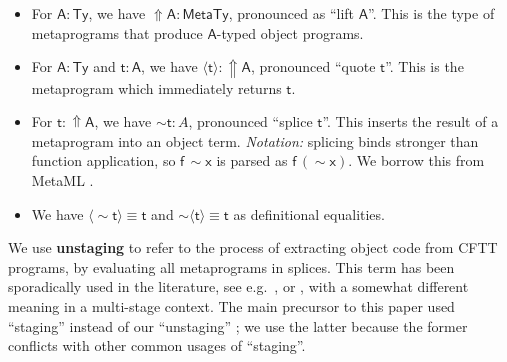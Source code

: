 \documentclass[acmsmall]{acmart}
\newcommand{\msf}[1]{{\mathsf{#1}}}
\newcommand{\bs}[1]{\boldsymbol{#1}}
\newcommand{\vA}{\mathsf{A}}
\newcommand{\vx}{\mathsf{x}}
\newcommand{\vf}{\mathsf{f}}
\newcommand{\vt}{\mathsf{t}}
\newcommand{\Lift}{{\Uparrow}}
\newcommand{\spl}{{\bs{\sim}}}
\newcommand{\ql}{{\bs{\langle}}}
\newcommand{\qr}{{\bs{\rangle}}}
\newcommand{\MTy}{\msf{MetaTy}}
\newcommand{\Ty}{\msf{Ty}}
\theoremstyle{remark}
\begin{document}
\begin{itemize}
\item For $\vA : \Ty$, we have $\Lift \vA : \MTy$, pronounced as ``lift $\vA$''. This is
      the type of metaprograms that produce $\vA$-typed object programs.
\item For $\vA : \Ty$ and $\vt : \vA$, we have $\ql \vt \qr : \Lift \vA$, pronounced ``quote $\vt$''. This
      is the metaprogram which immediately returns $\vt$.
\item For $\vt : \Lift \vA$, we have $\spl \vt : A$, pronounced ``splice
  $\vt$''. This inserts the result of a metaprogram into an object
  term. \emph{Notation:} splicing binds stronger than function application, so
  $\vf\,\spl \vx$ is parsed as $\vf\,(\spl \vx)$. We borrow this from
  MetaML \cite{metaml}.
\item We have $\ql \spl \vt \qr \equiv \vt$ and $\spl \ql \vt \qr \equiv \vt$ as definitional equalities.
\end{itemize}

We use \textbf{unstaging} to refer to the process of extracting object code from
CFTT programs, by evaluating all metaprograms in splices. This term has been
sporadically used in the literature, see
e.g.\ \cite{DBLP:journals/cacm/RompfO12}, or \cite{DBLP:conf/popl/ChoiAYT11},
with a somewhat different meaning in a multi-stage context. The main precursor
to this paper used ``staging'' instead of our ``unstaging'' \cite{staged2ltt};
we use the latter because the former conflicts with other common usages of
``staging''.
\end{document}
